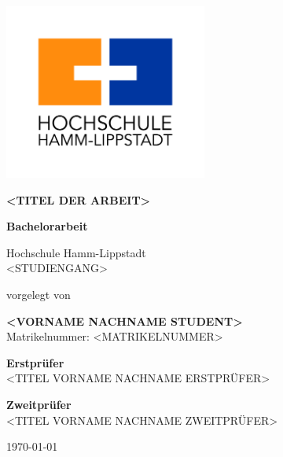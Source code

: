 \begin{titlepage}
    \begin{center}
    
    \includegraphics[width=0.5\textwidth]{res/img/hshl_logo.jpg}
    
    \Large
    \textbf{<TITEL DER ARBEIT>}
    \vspace{0.4cm}
    
    \large
    \textbf{Bachelorarbeit}
    
    Hochschule Hamm-Lippstadt\\
    <STUDIENGANG>

    vorgelegt von
    \vspace{0.1cm}
    
    \textbf{<VORNAME NACHNAME STUDENT>}\\
    Matrikelnummer: <MATRIKELNUMMER>
    \vspace{0.3cm}
    
    \textbf{Erstprüfer}\\
    <TITEL VORNAME NACHNAME ERSTPRÜFER>
    \vspace{0.3cm}
    
    \textbf{Zweitprüfer}\\
    <TITEL VORNAME NACHNAME ZWEITPRÜFER>
    \vspace{0.3cm}

    \today %

    \end{center}
    \end{titlepage}

    \newpage
    \cleardoublepage